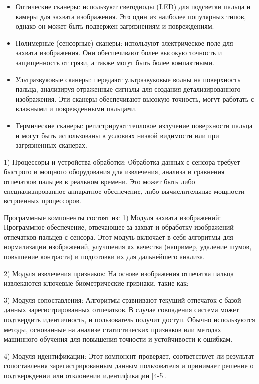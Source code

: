 \begin{multicols}{2}
\begin{itemize}[leftmargin=*]
\item
  Оптические сканеры: используют светодиоды (LED) для подсветки пальца и
  камеры для захвата изображения. Это один из наиболее популярных типов,
  однако он может быть подвержен загрязнениям и повреждениям.
\item
  Полимерные (сенсорные) сканеры: используют электрическое поле для
  захвата изображения. Они обеспечивают более высокую точность и
  защищенность от грязи, а также могут быть более компактными.
\item
  Ультразвуковые сканеры: передают ультразвуковые волны на поверхность
  пальца, анализируя отраженные сигналы для создания детализированного
  изображения. Эти сканеры обеспечивают высокую точность, могут работать
  с влажными и поврежденными пальцами.
\item
  Термические сканеры: регистрируют тепловое излучение поверхности
  пальца и могут быть использованы в условиях низкой видимости или при
  загрязненных сканерах.
\end{itemize}

1) Процессоры и устройства обработки: Обработка данных с сенсора требует
быстрого и мощного оборудования для извлечения, анализа и сравнения
отпечатков пальцев в реальном времени. Это может быть либо
специализированное аппаратное обеспечение, либо вычислительные
мощности встроенных процессоров.

Программные компоненты состоят из: 1) Модуля захвата изображений:
Программное обеспечение, отвечающее за захват и обработку изображений
отпечатков пальцев с сенсора. Этот модуль включает в себя алгоритмы для
нормализации изображений, улучшения их качества (например, удаление
шумов, повышение контраста) и подготовки их для дальнейшего анализа.

2) Модуля извлечения признаков: На основе изображения отпечатка пальца
извлекаются ключевые биометрические признаки, такие как:

3) Модуля сопоставления: Алгоритмы сравнивают текущий отпечаток с базой
данных зарегистрированных отпечатков. В случае совпадения система может
подтвердить идентичность, и пользователь получит доступ. Обычно
используются методы, основанные на анализе статистических признаков или
методах машинного обучения для повышения точности и устойчивости к
ошибкам.

4) Модуля идентификации: Этот компонент проверяет, соответствует ли
результат сопоставления зарегистрированным данным пользователя и
принимает решение о подтверждении или отклонении идентификации
{[}4-5{]}.


\end{multicols}
